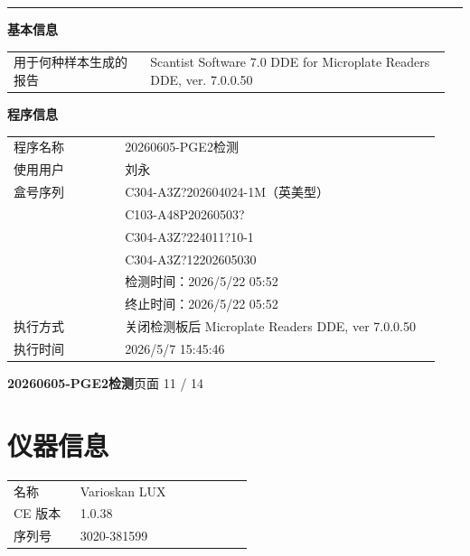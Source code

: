 \documentclass[UTF8,10pt,a4paper,fontset=fandol]{ctexart}
\begin{document}
\begin{minipage}{0.50\linewidth}
\vspace{0.5em}
\hrule
\vspace{0.4em}

\textbf{基本信息}

\begin{tabular}{@{}p{0.30\linewidth}p{0.66\linewidth}@{}}
用于何种样本生成的报告
  & Scantist Software 7.0 DDE for Microplate Readers DDE, ver. 7.0.0.50\\
\end{tabular}

\vspace{0.5em}

\textbf{程序信息}

\begin{tabular}{@{}p{0.25\linewidth}p{0.71\linewidth}@{}}
程序名称 & 20260605-PGE2检测\\
使用用户 & 刘永\\
盒号序列 & C304-A3Z?202604024-1M（英美型）\\
          & C103-A48P20260503?\\
          & C304-A3Z?224011?10-1\\
          & C304-A3Z?12202605030\\
          & 检测时间：2026/5/22 05:52\\
          & 终止时间：2026/5/22 05:52\\
执行方式 & 关闭检测板后 Microplate Readers DDE, ver 7.0.0.50\\
执行时间 & 2026/5/7 15:45:46\\
\end{tabular}
\end{minipage}


\newpage

\noindent\textbf{20260605-PGE2检测}\hfill 页面 11 / 14

\section*{仪器信息}

\begin{tabular}{@{}p{0.25\linewidth}p{0.65\linewidth}@{}}
名称 & Varioskan LUX \\
CE 版本 & 1.0.38 \\
序列号 & 3020-381599 \\
\end{tabular}
\end{document}
